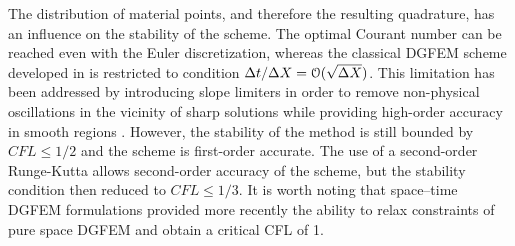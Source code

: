The distribution of material points, and therefore the resulting quadrature, has an influence on the stability of the scheme. The optimal Courant number can be reached even with the Euler discretization, whereas the classical DGFEM scheme developed in \cite{Chavent_Salzano} is restricted to condition $\Delta t / \Delta X = \mathcal{O}(\sqrt{\Delta X})$. This limitation has been addressed by introducing slope limiters in order to remove non-physical oscillations in the vicinity of sharp solutions while providing high-order accuracy in smooth regions \cite{Chavent_Cockburn}. However, the stability of the method is still bounded by $CFL\leq 1/2$ and the scheme is first-order accurate. The use of a second-order Runge-Kutta \cite{DGFEM_CFL} allows second-order accuracy of the scheme, but the stability condition then reduced to $CFL\leq1/3$. It is worth noting that space–time DGFEM formulations \cite{ST_DGFEM1,ST_DGFEM2} provided more recently the ability to relax constraints of pure space DGFEM and obtain a critical CFL of 1.

